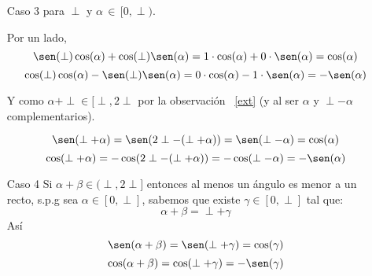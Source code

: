 \begin{pba}
\begin{enumerate}
\begin{enumerate}
\item[Caso 3] para $\perp$ y $\alpha\,\in\,[0,\perp)$.

Por un lado, 
\[\sen(\perp)\cos(\alpha) + \cos(\perp)\sen(\alpha)= 1\cdot\cos(\alpha) + 0\cdot\sen(\alpha)= \cos(\alpha)\]
\[\cos(\perp)\cos(\alpha) - \sen(\perp)\sen(\alpha)= 0\cdot\cos(\alpha) - 1\cdot\sen(\alpha)= -\sen(\alpha)\]

Y como $\alpha+\perp \in [\perp,2\perp$ por la observación ~\ref{ext} (y al ser $\alpha$ y $\perp - \alpha$ complementarios). 

\[\sen(\perp + \alpha)=\sen(2\perp-(\perp + \alpha))=\sen(\perp - \alpha)=\cos(\alpha)\]
\[\cos(\perp + \alpha)=-\cos(2\perp-(\perp + \alpha))=-\cos(\perp - \alpha)=-\sen(\alpha)\]


\item[Caso 4] Si $\alpha + \beta \in (\perp,2\perp]$ entonces al menos un ángulo es menor a un recto, s.p.g sea $\alpha \in [0,\perp]$, sabemos que existe $\gamma \in [0,\perp]$ tal que:
\[ \alpha + \beta = \perp + \gamma \]
Así 
\[\sen(\alpha + \beta) = \sen(\perp + \gamma)=\cos(\gamma)\]
\[\cos(\alpha + \beta) = \cos(\perp + \gamma)=-\sen(\gamma)\]


\end{enumerate}
\end{enumerate}
\end{pba}
